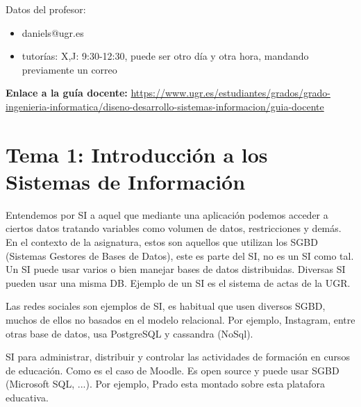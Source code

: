 \documentclass[12pt]{report} %
\providecommand{\tightlist}{%
  \setlength{\itemsep}{0pt}\setlength{\parskip}{0pt}}
\begin{document}
Datos del profesor:

\begin{itemize}
\tightlist
\item
  daniels@ugr.es\\
\item
  tutorías: X,J: 9:30-12:30, puede ser otro día y otra hora, mandando
  previamente un correo
\end{itemize}

\begin{center}
\textbf{Enlace a la guía docente:} \href{https://www.ugr.es/estudiantes/grados/grado-ingenieria-informatica/diseno-desarrollo-sistemas-informacion/guia-docente}{https://www.ugr.es/estudiantes/grados/grado-ingenieria-informatica/diseno-desarrollo-sistemas-informacion/guia-docente}
\end{center}

\hypertarget{tema-1-introducciuxf3n-a-los-sistemas-de-informaciuxf3n}{%
\chapter{Tema 1: Introducción a los Sistemas de
Información}\label{tema-1-introducciuxf3n-a-los-sistemas-de-informaciuxf3n}}

\begin{definicion}
Entendemos por SI a aquel que mediante una aplicación podemos acceder a ciertos datos tratando variables como volumen de datos, restricciones y demás. En el contexto de la asignatura, estos son aquellos que utilizan los SGBD (Sistemas Gestores de Bases de Datos), este es parte del SI, no es un SI como tal. Un SI puede usar varios o bien manejar bases de datos distribuidas. Diversas SI pueden usar una misma DB. Ejemplo de un SI es el sistema de actas de la UGR.
\end{definicion}

Las redes sociales son ejemplos de SI, es habitual que usen diversos
SGBD, muchos de ellos no basados en el modelo relacional. Por ejemplo,
Instagram, entre otras base de datos, usa PostgreSQL y cassandra
(NoSql).

\begin{definicion}
SI para administrar, distribuir y controlar las actividades de formación en cursos de educación. Como es el caso de Moodle. Es open source y puede usar SGBD (Microsoft SQL, ...). Por ejemplo, Prado esta montado sobre esta platafora educativa.
\end{definicion}
\end{document}
